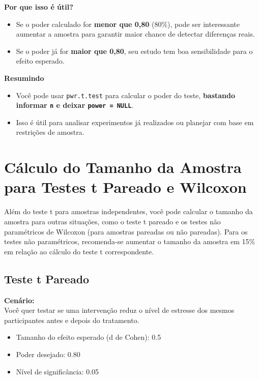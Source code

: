 \documentclass[
]{book}
\providecommand{\tightlist}{%
  \setlength{\itemsep}{0pt}\setlength{\parskip}{0pt}}
\begin{document}
\textbf{Por que isso é útil?}

\begin{itemize}
\tightlist
\item
  Se o poder calculado for \textbf{menor que 0,80} (80\%), pode ser interessante aumentar a amostra para garantir maior chance de detectar diferenças reais.
\item
  Se o poder já for \textbf{maior que 0,80}, seu estudo tem boa sensibilidade para o efeito esperado.
\end{itemize}

\textbf{Resumindo}

\begin{itemize}
\tightlist
\item
  Você pode usar \texttt{pwr.t.test} para calcular o poder do teste, \textbf{bastando informar \texttt{n} e deixar \texttt{power\ =\ NULL}}.
\item
  Isso é útil para analisar experimentos já realizados ou planejar com base em restrições de amostra.
\end{itemize}

\section{Cálculo do Tamanho da Amostra para Testes t Pareado e Wilcoxon}\label{cuxe1lculo-do-tamanho-da-amostra-para-testes-t-pareado-e-wilcoxon}

Além do teste t para amostras independentes, você pode calcular o tamanho da amostra para outras situações, como o teste t pareado e os testes não paramétricos de Wilcoxon (para amostras pareadas ou não pareadas). Para os testes não paramétricos, recomenda-se aumentar o tamanho da amostra em 15\% em relação ao cálculo do teste t correspondente.

\subsection{Teste t Pareado}\label{teste-t-pareado-1}

\textbf{Cenário:}\\
Você quer testar se uma intervenção reduz o nível de estresse dos mesmos participantes antes e depois do tratamento.

\begin{itemize}
\tightlist
\item
  Tamanho do efeito esperado (d de Cohen): 0.5\\
\item
  Poder desejado: 0.80\\
\item
  Nível de significância: 0.05
\end{itemize}
\end{document}
